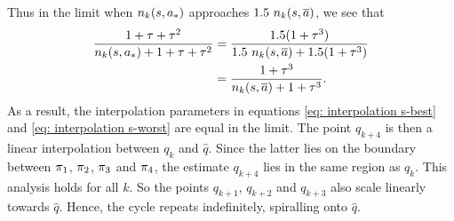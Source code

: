 Thus in the limit when $n_k(s,{a}_*)$ approaches $1.5 \ n_k(s,\overline{a})$, we see that
\begin{align*}
    \dfrac{1 + \tau + \tau^2}{n_k(s,{a}_*) + 1 + \tau + \tau^2}
    &= \dfrac{1.5(1 + \tau^3)}{1.5 \ n_k(s,\overline{a}) + 1.5(1 + \tau^3)}
    \\
    &= \dfrac{1 + \tau^3}{n_k(s,\overline{a}) + 1 + \tau^3} .
\end{align*}
As a result, the interpolation parameters in equations \eqref{eq: interpolation s-best} and \eqref{eq: interpolation s-worst} are equal in the limit.
The point $q_{k+4}$ is then a linear interpolation between $q_k$ and $\hat{q}$.
Since the latter lies on the boundary between $\pi_1$, $\pi_2$, $\pi_3$ and $\pi_4$, the estimate $q_{k+4}$ lies in the same region as $q_{k}$.
This analysis holds for all $k$. So the points $q_{k+1}$, $q_{k+2}$ and $q_{k+3}$ also scale linearly towards $\hat{q}$.
Hence, the cycle repeats indefinitely, spiralling onto $\hat{q}$.





